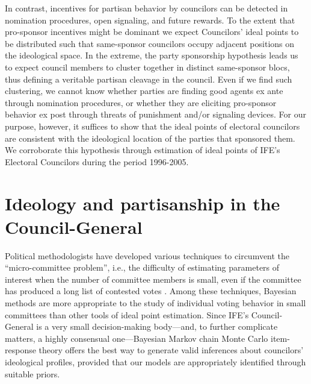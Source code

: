 \documentclass[12 pt, letter]{article}
\begin{document}
In contrast, incentives for partisan behavior by councilors can be detected in nomination procedures, open signaling, and future rewards.  To the extent that pro-sponsor incentives might be dominant we expect Councilors' ideal points to be distributed such that same-sponsor councilors occupy adjacent positions on the ideological space.  In the extreme, the party sponsorship hypothesis leads us to expect council members to cluster together in distinct same-sponsor blocs, thus defining a veritable partisan cleavage in the council.  Even if we find such clustering, we cannot know whether parties are finding good agents ex ante through nomination procedures, or whether they are eliciting pro-sponsor behavior ex post through threats of punishment and/or signaling devices.  For our purpose, however, it suffices to show that the ideal points of electoral councilors are consistent with the ideological location of the parties that sponsored them.  We corroborate this hypothesis through estimation of ideal points of IFE's Electoral Councilors during the period 1996-2005.

\singlespacing

\section{Ideology and partisanship in the Council-General}\label{S:estimation}

\doublespacing Political methodologists have developed various techniques to circumvent the ``micro-committee problem'', i.e., the difficulty of estimating parameters of interest when the number of committee members is small, even if the committee has produced a long list of contested votes \citep{Londregan2000}.  Among these techniques, Bayesian methods \citep{Martin2002, Clinton2004, Jackman2001} are more appropriate to the study of individual voting behavior in small committees than other tools of ideal point estimation.  Since IFE's Council-General is a very small decision-making body---and, to further complicate matters, a highly consensual one---Bayesian Markov chain Monte Carlo item-response theory  offers the best way to generate valid inferences about councilors' ideological profiles, provided that our models are appropriately identified through suitable priors.
\end{document}

